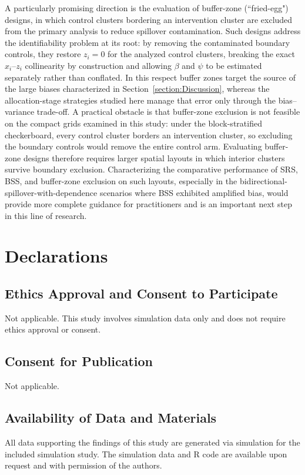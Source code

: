 \documentclass{article}[11pt]
\begin{document}
A particularly promising direction is the evaluation of buffer-zone (``fried-egg") designs, in which control clusters bordering an intervention cluster are excluded from the primary analysis to reduce spillover contamination\cite{jarvis_spatial_2017}. Such designs address the identifiability problem at its root: by removing the contaminated boundary controls, they restore $z_i = 0$ for the analyzed control clusters, breaking the exact $x_i$--$z_i$ collinearity by construction and allowing $\beta$ and $\psi$ to be estimated separately rather than conflated. In this respect buffer zones target the source of the large biases characterized in Section~\ref{section:Discussion}, whereas the allocation-stage strategies studied here manage that error only through the bias--variance trade-off. A practical obstacle is that buffer-zone exclusion is not feasible on the compact grids examined in this study: under the block-stratified checkerboard, every control cluster borders an intervention cluster, so excluding the boundary controls would remove the entire control arm. Evaluating buffer-zone designs therefore requires larger spatial layouts in which interior clusters survive boundary exclusion. Characterizing the comparative performance of SRS, BSS, and buffer-zone exclusion on such layouts, especially in the bidirectional-spillover-with-dependence scenarios where BSS exhibited amplified bias, would provide more complete guidance for practitioners and is an important next step in this line of research.

\section*{Declarations}

\subsection*{Ethics Approval and Consent to Participate}
Not applicable. This study involves simulation data only and does not require ethics approval or consent.

\subsection*{Consent for Publication}
Not applicable.

\subsection*{Availability of Data and Materials}
All data supporting the findings of this study are generated via simulation for the included simulation study. The simulation data and R code are available upon request and with permission of the authors.
\end{document}
